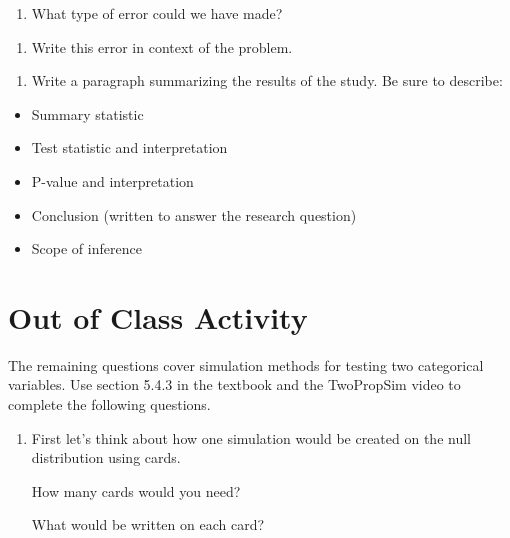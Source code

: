 \documentclass[
]{report}
\providecommand{\tightlist}{%
  \setlength{\itemsep}{0pt}\setlength{\parskip}{0pt}}
\begin{document}
\vspace{0.5in}

\begin{enumerate}
\def\labelenumi{\arabic{enumi}.}
\setcounter{enumi}{23}
\tightlist
\item
  What type of error could we have made?
\end{enumerate}

\vspace{0.5in}

\begin{enumerate}
\def\labelenumi{\arabic{enumi}.}
\setcounter{enumi}{24}
\tightlist
\item
  Write this error in context of the problem.
\end{enumerate}

\vspace{1in}

\begin{enumerate}
\def\labelenumi{\arabic{enumi}.}
\setcounter{enumi}{25}
\tightlist
\item
  Write a paragraph summarizing the results of the study. Be sure to describe:
\end{enumerate}

\begin{itemize}
\item
  Summary statistic
\item
  Test statistic and interpretation
\item
  P-value and interpretation
\item
  Conclusion (written to answer the research question)
\item
  Scope of inference
\end{itemize}

\vspace{2in}

\newpage

\hypertarget{out-of-class-activity}{%
\section{Out of Class Activity}\label{out-of-class-activity}}

The remaining questions cover simulation methods for testing two categorical variables. Use section 5.4.3 in the textbook and the TwoPropSim video to complete the following questions.

\begin{enumerate}
\def\labelenumi{\arabic{enumi}.}
\item
  First let's think about how one simulation would be created on the null distribution using cards.

  How many cards would you need?
  \vspace{0.1in}

  What would be written on each card?
\end{enumerate}
\end{document}
